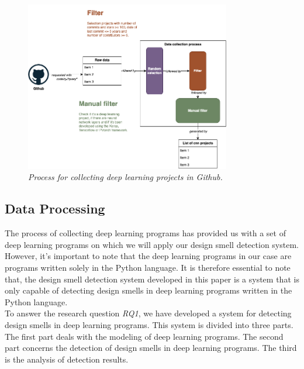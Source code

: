 \begin{figure}[h]
  \centering
  \includegraphics[width=0.8\textwidth]{figure/design_smell_data_collection.png}
  \caption{\emph{Process for collecting deep learning projects in Github.}}
  \label{fig:data_collect}
\end{figure}






\subsection{Data Processing}
\label{sec:DataProcessing}
The process of collecting deep learning programs has provided us with a set of deep learning programs on which we will apply our design smell detection system. However, it's important to note that the deep learning programs in our case are programs written solely in the Python language. It is therefore essential to note that, the design smell detection system developed in this paper is a system that is only capable of detecting design smells in deep learning programs written in the Python language.\\

To answer the research question \emph{RQ1}, we have developed a system for detecting design smells in deep learning programs. This system is divided into three parts. The first part deals with the modeling of deep learning programs. The second part concerns the detection of design smells in deep learning programs. The third is the analysis of detection results.\\

